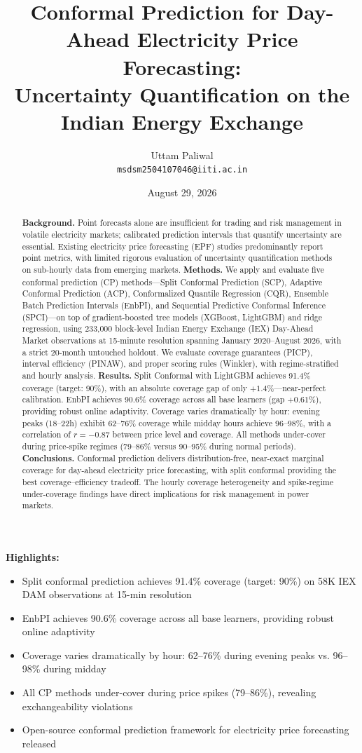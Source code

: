 \documentclass[preprint,12pt]{elsarticle}
\title{\bfseries Conformal Prediction for Day-Ahead Electricity Price Forecasting: \\
Uncertainty Quantification on the Indian Energy Exchange}
\author{Uttam Paliwal\\
\normalsize \texttt{msdsm2504107046@iiti.ac.in}}
\date{August 29, 2026}
\begin{document}
\maketitle

\begin{abstract}
\textbf{Background.} Point forecasts alone are insufficient for trading and risk management in volatile electricity markets; calibrated prediction intervals that quantify uncertainty are essential. Existing electricity price forecasting (EPF) studies predominantly report point metrics, with limited rigorous evaluation of uncertainty quantification methods on sub-hourly data from emerging markets. \textbf{Methods.} We apply and evaluate five conformal prediction (CP) methods---Split Conformal Prediction (SCP), Adaptive Conformal Prediction (ACP), Conformalized Quantile Regression (CQR), Ensemble Batch Prediction Intervals (EnbPI), and Sequential Predictive Conformal Inference (SPCI)---on top of gradient-boosted tree models (XGBoost, LightGBM) and ridge regression, using 233,000 block-level Indian Energy Exchange (IEX) Day-Ahead Market observations at 15-minute resolution spanning January 2020--August 2026, with a strict 20-month untouched holdout. We evaluate coverage guarantees (PICP), interval efficiency (PINAW), and proper scoring rules (Winkler), with regime-stratified and hourly analysis. \textbf{Results.} Split Conformal with LightGBM achieves 91.4\% coverage (target: 90\%), with an absolute coverage gap of only $+1.4\%$---near-perfect calibration. EnbPI achieves 90.6\% coverage across all base learners (gap $+0.61\%$), providing robust online adaptivity. Coverage varies dramatically by hour: evening peaks (18--22h) exhibit 62--76\% coverage while midday hours achieve 96--98\%, with a correlation of $r = -0.87$ between price level and coverage. All methods under-cover during price-spike regimes (79--86\% versus 90--95\% during normal periods). \textbf{Conclusions.} Conformal prediction delivers distribution-free, near-exact marginal coverage for day-ahead electricity price forecasting, with split conformal providing the best coverage--efficiency tradeoff. The hourly coverage heterogeneity and spike-regime under-coverage findings have direct implications for risk management in power markets.
\end{abstract}

\noindent\textbf{Highlights:}
\begin{itemize}
  \item Split conformal prediction achieves 91.4\% coverage (target: 90\%) on 58K IEX DAM observations at 15-min resolution
  \item EnbPI achieves 90.6\% coverage across all base learners, providing robust online adaptivity
  \item Coverage varies dramatically by hour: 62--76\% during evening peaks vs. 96--98\% during midday
  \item All CP methods under-cover during price spikes (79--86\%), revealing exchangeability violations
  \item Open-source conformal prediction framework for electricity price forecasting released
\end{itemize}
\end{document}
